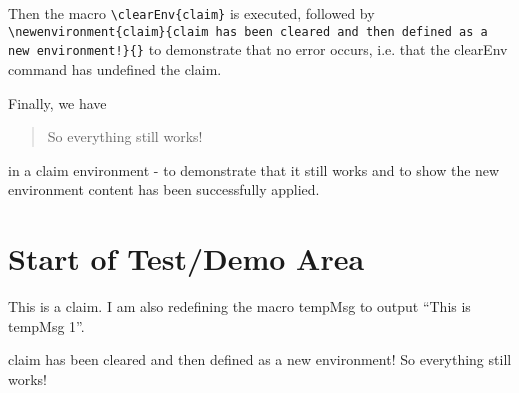 \documentclass{ximera}
\begin{document}
Then the macro \verb|\clearEnv{claim}| is executed, followed by 
\verb|\newenvironment{claim}{claim has been cleared and then defined as a new environment!}{}| to demonstrate that no error occurs, 
i.e. that the clearEnv command has undefined the claim. 

Finally, we have
\begin{quote}
So everything still works!
\end{quote}
in a claim environment - to demonstrate that it still works and to show the new environment content has been successfully applied.

\section{Start of Test/Demo Area}

\begin{claim}
This is a claim. I am also redefining the macro tempMsg to output ``This is tempMsg 1''. \renewcommand{\tmpMsg}{This is tempMsg 1}
\end{claim}




\tmpMsg


\newenvironment{claim}{claim has been cleared and then defined as a new environment!}{}

\begin{claim}
So everything still works!
\end{claim}


\hrulefill
\end{document}
